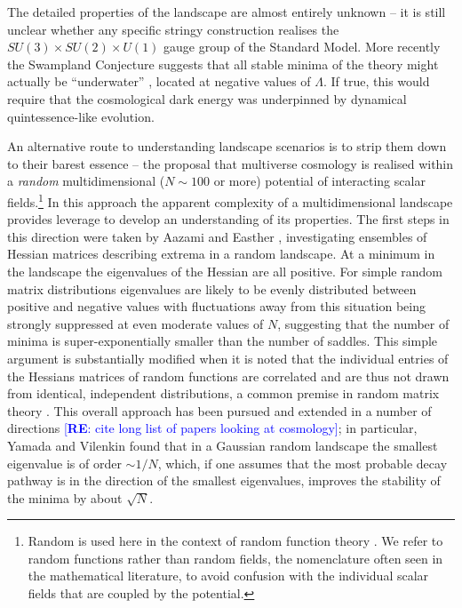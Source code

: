 \documentclass[12pt]{article}
\newcommand{\re}[1]{\textcolor{blue}{[{\bf RE}: #1]}}
\begin{document}
The detailed properties of the landscape are almost entirely unknown -- it is still unclear whether any specific stringy construction  realises  the $SU(3) \times SU(2) \times U(1)$ gauge group of the Standard Model.  More recently the Swampland Conjecture suggests that all stable minima of the theory might actually be ``underwater'' \cite{Agrawal2018},  located at negative values of $\Lambda$. If true, this would require that the cosmological dark energy was underpinned by dynamical quintessence-like evolution.   

An alternative route to understanding  landscape scenarios is to strip them down to their barest essence -- the proposal that multiverse cosmology is realised within a {\em random\/} multidimensional ($N\sim100$ or more) potential of interacting scalar fields.\footnote{Random is used here in the  context of random function theory \cite{GRF1, GRF2, GRF3}.  We refer to random functions rather than random fields, the nomenclature often seen in the mathematical literature, to avoid confusion with the individual scalar fields that are coupled by the potential.}  In this approach the apparent complexity of a multidimensional landscape  provides  leverage to develop an understanding of its properties. The first steps in this direction were taken by Aazami and Easther \cite{Aazami2006}, investigating ensembles of Hessian matrices describing extrema in a random landscape.  At  a minimum in the landscape the eigenvalues of the Hessian are all positive. For simple random matrix distributions eigenvalues are likely to be evenly distributed between positive and negative values with fluctuations away from this situation being strongly suppressed at even moderate values of $N$, suggesting that the number of minima is super-exponentially smaller than the number of saddles. This simple argument is substantially modified when it is noted that the individual entries of the Hessians matrices of random functions are correlated and are thus not drawn from identical, independent distributions, a common premise in random matrix theory \cite{Battefeld2012}\cite{Easther2016}. This overall approach has been pursued and extended in a number of directions \cite{Easther2006, Frazer2011, Henry2009, Marsh2013, Agarwal2011,Yang2012} \re{cite long list of papers looking at cosmology}; in particular, Yamada and Vilenkin found that in a Gaussian random landscape the smallest eigenvalue is of order $\sim 1/N$, which, if one assumes that the most probable decay pathway is in the direction of the smallest eigenvalues, improves the stability of the minima by about $\sqrt{N}$.\cite{Yamada2018} 
\end{document}

